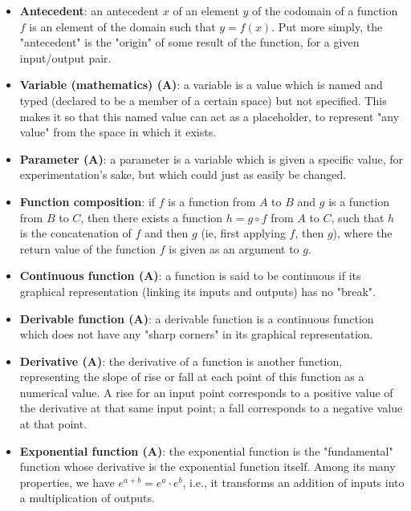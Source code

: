 \documentclass{article}
\begin{document}
\begin{itemize}
    \item \textbf{Antecedent}: an antecedent $x$ of an element $y$ of the codomain of a function $f$ is an element of the domain such that $y = f(x)$. Put more simply, the "antecedent" is the "origin" of some result of the function, for a given input/output pair.
    
    \item \textbf{Variable (mathematics) (A)}: a variable is a value which is named and typed (declared to be a member of a certain space) but not specified. This makes it so that this named value can act as a placeholder, to represent "any value" from the space in which it exists.
    
    \item \textbf{Parameter (A)}: a parameter is a variable which is given a specific value, for experimentation's sake, but which could just as easily be changed.
    
    \item \textbf{Function composition}: if $f$ is a function from $A$ to $B$ and $g$ is a function from $B$ to $C$, then there exists a function $h = g \circ f$ from $A$ to $C$, such that $h$ is the concatenation of $f$ and then $g$ (ie, first applying $f$, then $g$), where the return value of the function $f$ is given as an argument to $g$.
    
    \item \textbf{Continuous function (A)}: a function is said to be continuous if its graphical representation (linking its inputs and outputs) has no "break".
    
    \item \textbf{Derivable function (A)}: a derivable function is a continuous function which does not have any "sharp corners" in its graphical representation.
    
    \item \textbf{Derivative (A)}: the derivative of a function is another function, representing the slope of rise or fall at each point of this function as a numerical value. A rise for an input point corresponds to a positive value of the derivative at that same input point; a fall corresponds to a negative value at that point.
    
    \item \textbf{Exponential function (A)}: the exponential function is the "fundamental" function whose derivative is the exponential function itself. Among its many properties, we have $e^{a + b} = e^a \cdot e^b$, i.e., it transforms an addition of inputs into a multiplication of outputs.
    

\end{itemize}
\end{document}
